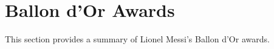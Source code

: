 \section{Ballon d'Or Awards}\label{sec:ballon_dor}

This section provides a summary of Lionel Messi's Ballon d'Or awards.


